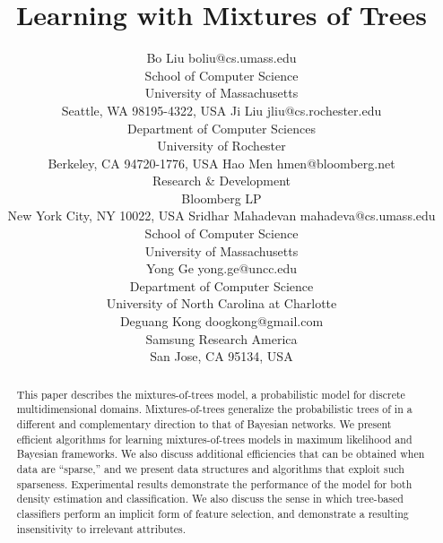 \documentclass[twoside,11pt]{article}
\begin{document}
\title{Learning with Mixtures of Trees}

\author{\name Bo Liu \email boliu@cs.umass.edu \\
       \addr School of Computer Science \\
       University of Massachusetts \\
       Seattle, WA 98195-4322, USA
       \AND
       \name Ji Liu \email jliu@cs.rochester.edu \\
       \addr Department of Computer Sciences \\
       University of Rochester \\ 
       Berkeley, CA 94720-1776, USA
       \AND
       \name Hao Men \email hmen@bloomberg.net \\
       \addr Research \& Development \\
       Bloomberg LP \\
       New York City, NY 10022, USA
       \AND
       \name Sridhar Mahadevan \email mahadeva@cs.umass.edu \\
       \addr School of Computer Science \\
       University of Massachusetts \\
       \AND
       \name Yong Ge \email yong.ge@uncc.edu \\
       \addr Department of Computer Science \\
       University of North Carolina at Charlotte \\
       \AND
       \name Deguang Kong \email doogkong@gmail.com \\
       \addr Samsung Research America \\
       San Jose, CA 95134, USA
       }


\maketitle

\begin{abstract}%
This paper describes the mixtures-of-trees model, a probabilistic 
model for discrete multidimensional domains.  Mixtures-of-trees 
generalize the probabilistic trees of \citet{chow:68}
in a different and complementary direction to that of Bayesian networks.
We present efficient algorithms for learning mixtures-of-trees 
models in maximum likelihood and Bayesian frameworks. 
We also discuss additional efficiencies that can be
obtained when data are ``sparse,'' and we present data 
structures and algorithms that exploit such sparseness.
Experimental results demonstrate the performance of the 
model for both density estimation and classification. 
We also discuss the sense in which tree-based classifiers
perform an implicit form of feature selection, and demonstrate
a resulting insensitivity to irrelevant attributes.
\end{abstract}
\end{document}
